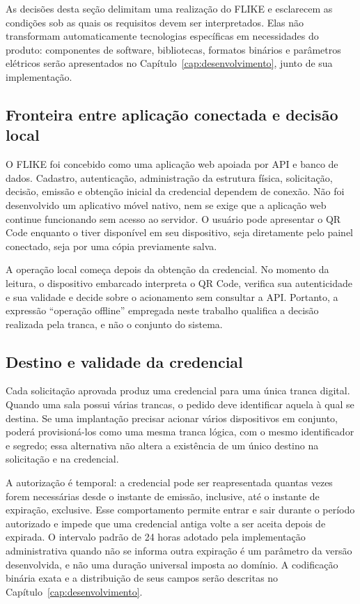As decisões desta seção delimitam uma realização do FLIKE e esclarecem as condições sob as quais os requisitos devem ser interpretados. Elas não transformam automaticamente tecnologias específicas em necessidades do produto: componentes de software, bibliotecas, formatos binários e parâmetros elétricos serão apresentados no Capítulo~\ref{cap:desenvolvimento}, junto de sua implementação.

\subsection{Fronteira entre aplicação conectada e decisão local}

O FLIKE foi concebido como uma aplicação web apoiada por API e banco de dados. Cadastro, autenticação, administração da estrutura física, solicitação, decisão, emissão e obtenção inicial da credencial dependem de conexão. Não foi desenvolvido um aplicativo móvel nativo, nem se exige que a aplicação web continue funcionando sem acesso ao servidor. O usuário pode apresentar o QR Code enquanto o tiver disponível em seu dispositivo, seja diretamente pelo painel conectado, seja por uma cópia previamente salva.

A operação local começa depois da obtenção da credencial. No momento da leitura, o dispositivo embarcado interpreta o QR Code, verifica sua autenticidade e sua validade e decide sobre o acionamento sem consultar a API. Portanto, a expressão ``operação offline'' empregada neste trabalho qualifica a decisão realizada pela tranca, e não o conjunto do sistema.

\subsection{Destino e validade da credencial}

Cada solicitação aprovada produz uma credencial para uma única tranca digital. Quando uma sala possui várias trancas, o pedido deve identificar aquela à qual se destina. Se uma implantação precisar acionar vários dispositivos em conjunto, poderá provisioná-los como uma mesma tranca lógica, com o mesmo identificador e segredo; essa alternativa não altera a existência de um único destino na solicitação e na credencial.

A autorização é temporal: a credencial pode ser reapresentada quantas vezes forem necessárias desde o instante de emissão, inclusive, até o instante de expiração, exclusive. Esse comportamento permite entrar e sair durante o período autorizado e impede que uma credencial antiga volte a ser aceita depois de expirada. O intervalo padrão de 24 horas adotado pela implementação administrativa quando não se informa outra expiração é um parâmetro da versão desenvolvida, e não uma duração universal imposta ao domínio. A codificação binária exata e a distribuição de seus campos serão descritas no Capítulo~\ref{cap:desenvolvimento}.

